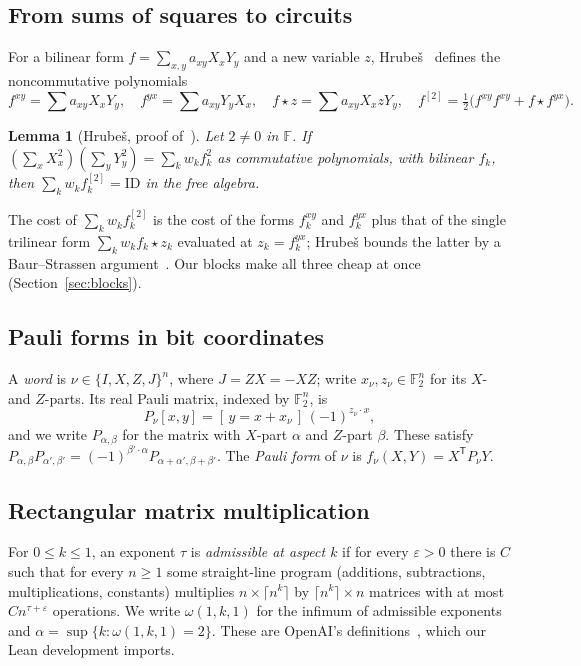 \documentclass[11pt]{article}
\newtheorem{lemma}[theorem]{Lemma}
\theoremstyle{definition}
\theoremstyle{remark}
\newcommand{\F}{\mathbb{F}}
\newcommand{\ID}{\mathrm{ID}}
\begin{document}
\subsection{From sums of squares to circuits}
For a bilinear form $f=\sum_{x,y}a_{xy}X_xY_y$ and a new variable $z$, Hrube\v{s}~\cite{Hrubes2026} defines the
noncommutative polynomials
\[
f^{xy}=\sum a_{xy}X_xY_y,\quad f^{yx}=\sum a_{xy}Y_yX_x,\quad f\star z=\sum a_{xy}X_xzY_y,\quad
f^{[2]}=\tfrac12\bigl(f^{xy}f^{xy}+f\star f^{yx}\bigr).
\]
\begin{lemma}[Hrube\v{s}, proof of~{\cite[Lemma~22]{Hrubes2026}}]\label{lem:hrubes}
Let $2\ne0$ in $\F$. If $(\sum_xX_x^2)(\sum_yY_y^2)=\sum_kw_kf_k^2$ as commutative polynomials, with bilinear $f_k$,
then $\sum_kw_kf_k^{[2]}=\ID$ in the free algebra.
\end{lemma}
The cost of $\sum_k w_kf_k^{[2]}$ is the cost of the forms $f^{xy}_k$ and $f^{yx}_k$ plus that of the single
trilinear form $\sum_kw_kf_k\star z_k$ evaluated at $z_k=f_k^{yx}$; Hrube\v{s} bounds the latter by a
Baur--Strassen argument~\cite{BaurStrassen1983}. Our blocks make all three cheap at once (Section~\ref{sec:blocks}).

\subsection{Pauli forms in bit coordinates}
A \emph{word} is $\nu\in\{I,X,Z,J\}^n$, where $J=ZX=-XZ$; write $x_\nu,z_\nu\in\F_2^n$ for its $X$- and $Z$-parts. Its
real Pauli matrix, indexed by $\F_2^n$, is
\[
P_\nu[x,y]=[\,y=x+x_\nu\,]\,(-1)^{z_\nu\cdot x},
\]
and we write $P_{\alpha,\beta}$ for the matrix with $X$-part $\alpha$ and $Z$-part $\beta$. These satisfy
$P_{\alpha,\beta}P_{\alpha',\beta'}=(-1)^{\beta'\cdot\alpha}P_{\alpha+\alpha',\beta+\beta'}$. The \emph{Pauli
form} of $\nu$ is $f_\nu(X,Y)=X^{\mathsf T}P_\nu Y$.

\subsection{Rectangular matrix multiplication}\label{sec:prelim-mm}
For $0\le k\le1$, an exponent $\tau$ is \emph{admissible at aspect $k$} if for every $\varepsilon>0$ there is $C$
such that for every $n\ge1$ some straight-line program (additions, subtractions, multiplications, constants)
multiplies $n\times\lceil n^k\rceil$ by $\lceil n^k\rceil\times n$ matrices with at most $C n^{\tau+\varepsilon}$
operations. We write $\omega(1,k,1)$ for the infimum of admissible exponents and $\alpha=\sup\{k:\omega(1,k,1)=2\}$.
These are OpenAI's definitions~\cite{OAI2026lean}, which our Lean development imports.
\end{document}
